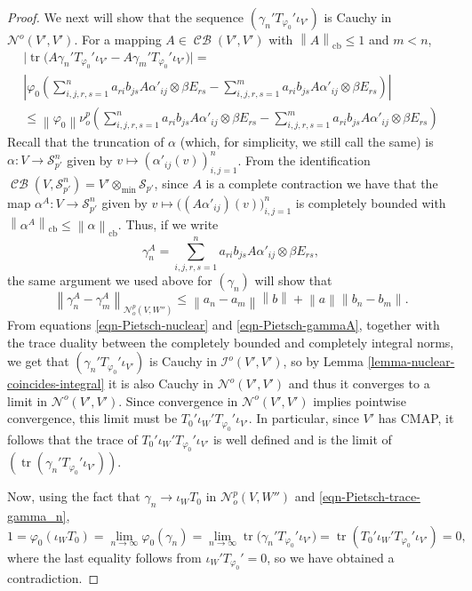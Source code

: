 \documentclass[11pt]{amsart}
\DeclareMathOperator{\cb}{cb}
\DeclareMathOperator{\CB}{\mathcal{CB}}
\DeclareMathOperator{\tr}{tr}
\newcommand{\n}[1]{ \left\|#1\right\| }
\numberwithin{equation}{section}
\begin{document}
\begin{proof}
We next will show that the sequence $(\gamma_n' T_{\varphi_0}' \iota_{V'})$ is Cauchy in $\mathcal{N}^o(V',V')$. 
For a mapping $A \in \CB(V',V')$ with $\n{A}_{\cb} \le 1$ and $m < n$, 
\begin{multline}\label{eqn-Pietsch-nuclear}
\big|\tr\big( A\gamma_n' T_{\varphi_0}' \iota_{V'} - A \gamma_m' T_{\varphi_0}' \iota_{V'}\big)\big| = \\
\left| \varphi_0\left( \sum_{i,j,r,s=1}^n a_{ri}b_{js} A\alpha'_{ij} \otimes \beta E_{rs} - \sum_{i,j,r,s=1}^m a_{ri}b_{js} A\alpha'_{ij} \otimes \beta E_{rs} \right) \right|  
\\
\le \n{\varphi_0} \nu^p_o\left( \sum_{i,j,r,s=1}^n a_{ri}b_{js} A\alpha'_{ij} \otimes \beta E_{rs} - \sum_{i,j,r,s=1}^m a_{ri}b_{js} A\alpha'_{ij} \otimes \beta E_{rs} \right)
\end{multline}
Recall that the truncation of $\alpha$ (which, for simplicity, we still call the same) is $\alpha : V \to \mathcal{S}_{p'}^n$ given by $v \mapsto (\alpha'_{ij}(v))_{i,j=1}^n$.
From the identification $\CB(V, \mathcal{S}_{p'}^n) =  V' \otimes_{\min}\mathcal{S}_{p'}$, since $A$ is a complete contraction we have that the map $\alpha^A : V \to \mathcal{S}_{p'}^n$ given by  $v \mapsto \big((A\alpha'_{ij})(v)\big)_{i,j=1}^n$ is completely bounded with $\n{\alpha^A}_{\cb} \le \n{\alpha}_{\cb}$.
Thus, if we write
\[
\gamma_n^A = \sum_{i,j,r,s=1}^n a_{ri}b_{js} A\alpha'_{ij} \otimes \beta E_{rs},
\]
the same argument we used above for $(\gamma_n)$ will show that
\begin{equation}\label{eqn-Pietsch-gammaA}
\n{\gamma_n^A - \gamma_m^A}_{\mathcal{N}^p_o(V,W'')} \le  \n{a_n -a_m} \n{b} + \n{a}\n{b_n-b_m}.    
\end{equation}
From equations \eqref{eqn-Pietsch-nuclear} and \eqref{eqn-Pietsch-gammaA}, together with the trace duality between the completely bounded and completely integral norms, we get that  $(\gamma_n' T_{\varphi_0}' \iota_{V'})$ is Cauchy in $\mathcal{I}^o(V',V')$, so by  Lemma \ref{lemma-nuclear-coincides-integral} it is also Cauchy in ${\mathcal{N}^o(V',V')}$
and thus it converges to a limit in $\mathcal{N}^o(V',V')$. Since convergence in $\mathcal{N}^o(V',V')$ implies pointwise convergence, this limit must be $T_0'\iota_W'T_{\varphi_0}' \iota_{V'}$. In particular, since $V'$ has CMAP, it follows that the trace of $T_0'\iota_W'T_{\varphi_0}' \iota_{V'}$ is well defined and is the limit of $(\tr(\gamma_n' T_{\varphi_0}' \iota_{V'}))$.

Now, using the fact that $\gamma_n \to \iota_WT_0$ in $\mathcal{N}^p_o(V,W'')$ and \eqref{eqn-Pietsch-trace-gamma_n},
\[
1 =  \varphi_0( \iota_WT_0  ) = \lim_{n\to\infty} \varphi_0( \gamma_n ) = \lim_{n\to\infty} \tr\big( \gamma_n' T_{\varphi_0}' \iota_{V'}\big) = \tr(T_0'\iota_W'T_{\varphi_0}' \iota_{V'}) = 0,
\]
where the last equality follows from $\iota_W'T_{\varphi_0}' = 0$, so we have obtained a contradiction.
\end{proof}
\end{document}
